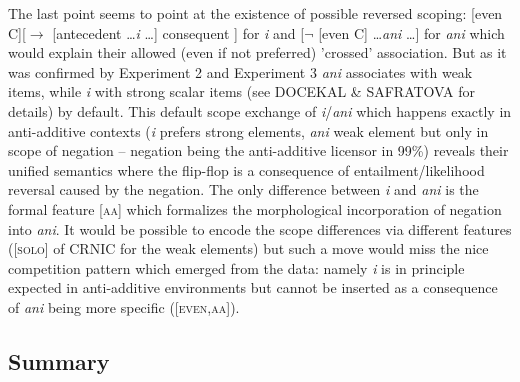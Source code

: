 \documentclass[12pt]{scrartcl}
\begin{document}
The last point seems to point at the existence of possible reversed scoping: [even C][$\rightarrow$ [antecedent \ldots \textit{i} \ldots] consequent ] for \textit{i} and  [$\neg$ [even C] \ldots \textit{ani} \ldots] for \textit{ani} which would explain their allowed (even if not preferred) 'crossed' association. But as it was confirmed by Experiment 2 and Experiment 3 \textit{ani} associates with weak items, while \textit{i} with strong scalar items (see DOCEKAL \& SAFRATOVA for details) by default. This default scope exchange of \textit{i}/\textit{ani} which happens exactly in anti-additive contexts (\textit{i} prefers strong elements, \textit{ani} weak element but only in scope of negation -- negation being the anti-additive licensor in 99\%) reveals their unified semantics where the flip-flop is a consequence of entailment/likelihood reversal caused by the negation. The only difference between \textit{i} and \textit{ani} is the formal feature [\textsc{aa}] which formalizes the morphological incorporation of negation into \textit{ani}.  It would be possible to encode the scope differences via different features ([\textsc{solo}] of CRNIC for the weak elements) but such a move would miss the nice competition pattern which emerged from the data: namely \textit{i} is in principle expected in anti-additive environments but cannot be inserted as a consequence of \textit{ani} being more specific ([\textsc{even,aa}]).

\hypertarget{summary}{%
\subsection{Summary}\label{summary}}
\end{document}
